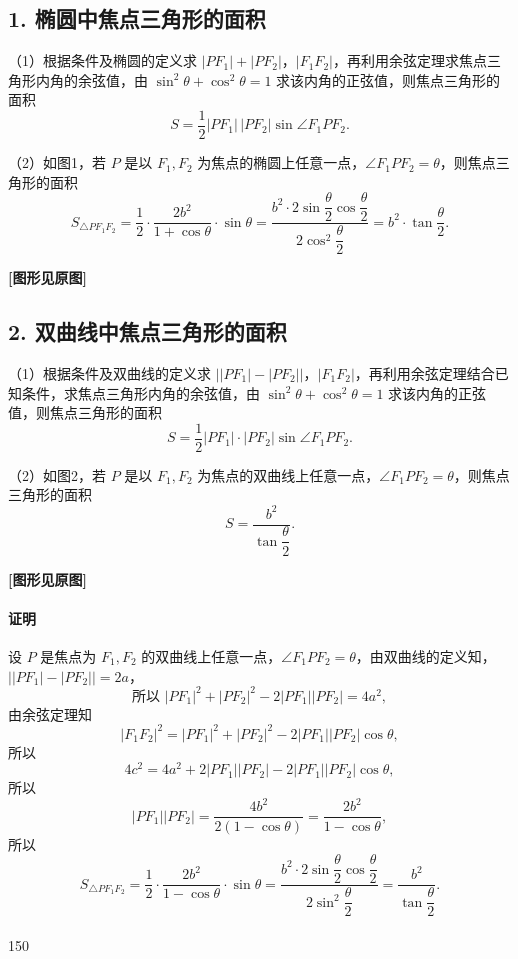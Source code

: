 \documentclass[UTF8,a4paper,11pt]{ctexart}
\begin{document}
\subsection*{1. 椭圆中焦点三角形的面积}
（1）根据条件及椭圆的定义求 $|PF_1|+|PF_2|$，$|F_1F_2|$，再利用余弦定理求焦点三角形内角的余弦值，由 $\sin^2\theta+\cos^2\theta=1$ 求该内角的正弦值，则焦点三角形的面积
\[
S=\frac{1}{2}|PF_1|\,|PF_2|\sin\angle F_1PF_2.
\]

（2）如图1，若 $P$ 是以 $F_1,F_2$ 为焦点的椭圆上任意一点，$\angle F_1PF_2=\theta$，则焦点三角形的面积
\[
S_{\triangle PF_1F_2}=\frac{1}{2}\cdot\frac{2b^2}{1+\cos\theta}\cdot\sin\theta
=\frac{b^2\cdot 2\sin\dfrac{\theta}{2}\cos\dfrac{\theta}{2}}{2\cos^2\dfrac{\theta}{2}}
=b^2\cdot\tan\frac{\theta}{2}.
\]

\textbf{[图形见原图]}

\subsection*{2. 双曲线中焦点三角形的面积}
（1）根据条件及双曲线的定义求 $\bigl||PF_1|-|PF_2|\bigr|$，$|F_1F_2|$，再利用余弦定理结合已知条件，求焦点三角形内角的余弦值，由 $\sin^2\theta+\cos^2\theta=1$ 求该内角的正弦值，则焦点三角形的面积
\[
S=\frac{1}{2}|PF_1|\cdot|PF_2|\sin\angle F_1PF_2.
\]

（2）如图2，若 $P$ 是以 $F_1,F_2$ 为焦点的双曲线上任意一点，$\angle F_1PF_2=\theta$，则焦点三角形的面积
\[
S=\frac{b^2}{\tan\dfrac{\theta}{2}}.
\]

\textbf{[图形见原图]}

\paragraph{证明}
设 $P$ 是焦点为 $F_1,F_2$ 的双曲线上任意一点，$\angle F_1PF_2=\theta$，由双曲线的定义知，$\bigl||PF_1|-|PF_2|\bigr|=2a$，
\[
\text{所以 }|PF_1|^2+|PF_2|^2-2|PF_1||PF_2|=4a^2,
\]
由余弦定理知
\[
|F_1F_2|^2=|PF_1|^2+|PF_2|^2-2|PF_1||PF_2|\cos\theta,
\]
所以
\[
4c^2=4a^2+2|PF_1||PF_2|-2|PF_1||PF_2|\cos\theta,
\]
所以
\[
|PF_1||PF_2|=\frac{4b^2}{2(1-\cos\theta)}=\frac{2b^2}{1-\cos\theta},
\]
所以
\[
S_{\triangle PF_1F_2}=\frac{1}{2}\cdot\frac{2b^2}{1-\cos\theta}\cdot\sin\theta
=\frac{b^2\cdot 2\sin\dfrac{\theta}{2}\cos\dfrac{\theta}{2}}{2\sin^2\dfrac{\theta}{2}}
=\frac{b^2}{\tan\dfrac{\theta}{2}}.
\]

\paragraph{}150
\end{document}
